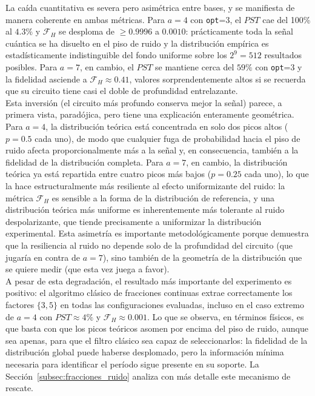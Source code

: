 \documentclass[12pt, spanish]{book}
\begin{document}
La caída cuantitativa es severa pero asimétrica entre bases, y se manifiesta de manera coherente en ambas métricas. Para $a = 4$ con \texttt{opt}=3, el $PST$ cae del 100\% al $4.3\%$ y $\mathcal{F}_H$ se desploma de $\geq 0.9996$ a $0.0010$: prácticamente toda la señal cuántica se ha disuelto en el piso de ruido y la distribución empírica es estadísticamente indistinguible del fondo uniforme sobre los $2^9 = 512$ resultados posibles. Para $a = 7$, en cambio, el $PST$ se mantiene cerca del $59\%$ con \texttt{opt}=3 y la fidelidad asciende a $\mathcal{F}_H \approx 0.41$, valores sorprendentemente altos si se recuerda que su circuito tiene casi el doble de profundidad entrelazante.\\

Esta inversión (el circuito más profundo conserva mejor la señal) parece, a primera vista, paradójica, pero tiene una explicación enteramente geométrica. Para $a = 4$, la distribución teórica está concentrada en solo dos picos altos ($p = 0.5$ cada uno), de modo que cualquier fuga de probabilidad hacia el piso de ruido afecta proporcionalmente más a la señal y, en consecuencia, también a la fidelidad de la distribución completa. Para $a = 7$, en cambio, la distribución teórica ya está repartida entre cuatro picos más bajos ($p = 0.25$ cada uno), lo que la hace estructuralmente más resiliente al efecto uniformizante del ruido: la métrica $\mathcal{F}_H$ es sensible a la forma de la distribución de referencia, y una distribución teórica más uniforme es inherentemente más tolerante al ruido despolarizante, que tiende precisamente a uniformizar la distribución experimental. Esta asimetría es importante metodológicamente porque demuestra que la resiliencia al ruido no depende solo de la profundidad del circuito (que jugaría en contra de $a = 7$), sino también de la geometría de la distribución que se quiere medir (que esta vez juega a favor).\\

A pesar de esta degradación, el resultado más importante del experimento es positivo: el algoritmo clásico de fracciones continuas extrae correctamente los factores $\{3, 5\}$ en todas las configuraciones evaluadas, incluso en el caso extremo de $a = 4$ con $PST \approx 4\%$ y $\mathcal{F}_H \approx 0.001$. Lo que se observa, en términos físicos, es que basta con que los picos teóricos asomen por encima del piso de ruido, aunque sea apenas, para que el filtro clásico sea capaz de seleccionarlos: la fidelidad de la distribución global puede haberse desplomado, pero la información mínima necesaria para identificar el período sigue presente en su soporte. La Sección~\ref{subsec:fracciones_ruido} analiza con más detalle este mecanismo de rescate.
\end{document}
